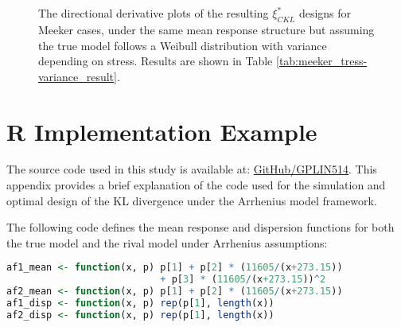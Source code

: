 
\begin{figure}[H]
\centering
{}
 \\
 \\
\caption{The directional derivative plots of the resulting $\xi^*_{CKL}$ designs for Meeker cases, under the same mean response structure but assuming the true model follows a Weibull distribution with variance depending on stress. Results are shown in Table \ref{tab:meeker_tress-variance_result}.}
\label{fig:meeker_tress-variance_result_wb}
\end{figure}

\chapter{R Implementation Example}\label{appendixB}

\hspace*{8mm} The source code used in this study is available at: \href{https://github.com/GPLIN514/Master-Thesis-ALT-Model-Discrimination-Design/blob/main/Thesis-code/code/Appendix%20B%20example%20code.R}{GitHub/GPLIN514}. This appendix provides a brief explanation of the code used for the simulation and optimal design of the KL divergence under the Arrhenius model framework.

\hspace*{8mm} The following code defines the mean response and dispersion functions for both the true model and the rival model under Arrhenius assumptions:

\begin{lstlisting}[language=R, caption={Model structure settings}]
af1_mean <- function(x, p) p[1] + p[2] * (11605/(x+273.15)) 
                           + p[3] * (11605/(x+273.15))^2
af2_mean <- function(x, p) p[1] + p[2] * (11605/(x+273.15))
af1_disp <- function(x, p) rep(p[1], length(x))
af2_disp <- function(x, p) rep(p[1], length(x))
\end{lstlisting}

